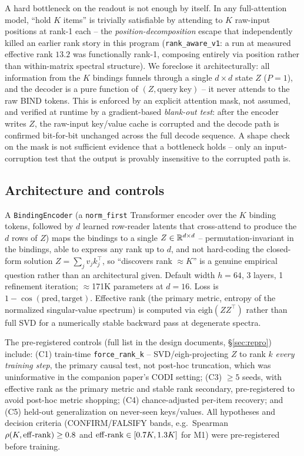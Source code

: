 A hard bottleneck on the readout is not enough by itself. In any
full-attention model, ``hold $K$ items'' is trivially satisfiable by
attending to $K$ raw-input positions at rank-1 each -- the
\emph{position-decomposition} escape that independently killed an earlier
rank story in this program (\texttt{rank\_aware\_v1}: a run at measured
effective rank $13.2$ was functionally rank-1, composing entirely via
position rather than within-matrix spectral structure). We foreclose it
architecturally: all information from the $K$ bindings funnels through a
single $d\times d$ state $Z$ ($P{=}1$), and the decoder is a pure function
of $(Z,\mathrm{query\ key})$ -- it never attends to the raw BIND tokens.
This is enforced by an explicit attention mask, not assumed, and verified
at runtime by a gradient-based \emph{blank-out test}: after the encoder
writes $Z$, the raw-input key/value cache is corrupted and the decode path
is confirmed bit-for-bit unchanged across the full decode sequence. A shape
check on the mask is not sufficient evidence that a bottleneck holds --
only an input-corruption test that the output is provably insensitive to
the corrupted path is.

\subsection{Architecture and controls}
\label{sec:setup-arch}

A \texttt{BindingEncoder} (a \texttt{norm\_first} Transformer encoder over
the $K$ binding tokens, followed by $d$ learned row-reader latents that
cross-attend to produce the $d$ rows of $Z$) maps the bindings to a single
$Z\in\mathbb{R}^{d\times d}$ -- permutation-invariant in the bindings, able to
express any rank up to $d$, and not hard-coding the closed-form solution
$Z=\sum_j v_jk_j^\top$, so ``discovers rank $\approx K$'' is a genuine
empirical question rather than an architectural given. Default width
$h=64$, 3 layers, 1 refinement iteration; $\approx$171K parameters at
$d=16$. Loss is $1-\cos(\mathrm{pred},\mathrm{target})$. Effective rank
(the primary metric, entropy of the normalized singular-value spectrum) is
computed via $\mathrm{eigh}(ZZ^\top)$ rather than full SVD for a
numerically stable backward pass at degenerate spectra.

The pre-registered controls (full list in the design documents,
\S\ref{sec:repro}) include: (C1) train-time \texttt{force\_rank\_k} --
SVD/eigh-projecting $Z$ to rank $k$ \emph{every training step}, the primary
causal test, not post-hoc truncation, which was uninformative in the
companion paper's CODI setting; (C3) $\geq 5$ seeds, with effective rank as
the primary metric and stable rank secondary, pre-registered to avoid
post-hoc metric shopping; (C4) chance-adjusted per-item recovery; and (C5)
held-out generalization on never-seen keys/values. All hypotheses and
decision criteria (CONFIRM/FALSIFY bands, e.g.\ Spearman
$\rho(K,\operatorname{eff\text{-}rank})\geq 0.8$ and $\operatorname{eff\text{-}rank}\in[0.7K,1.3K]$ for M1) were
pre-registered before training.
